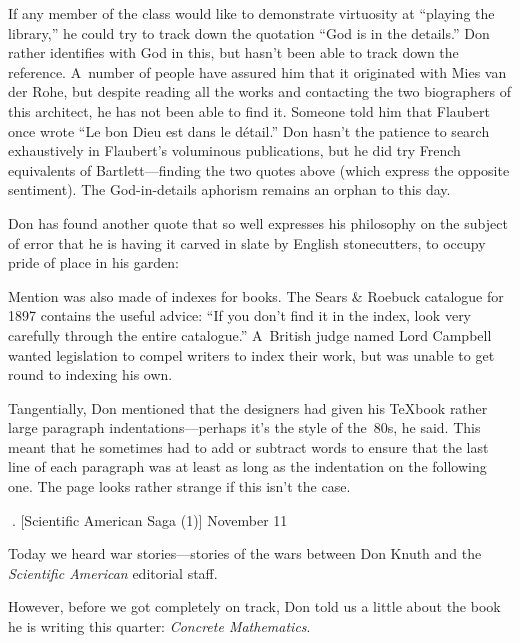 If any member of the class would like to demonstrate virtuosity at
``playing the library,'' he could try to track down the quotation ``God
is in the details.'' Don rather identifies with God in this, but
hasn't been able to track down the reference. A~number of people have
assured him that it originated with Mies van der Rohe, but
despite reading all the works and contacting the two biographers of
this architect, he has not been able to find it. Someone told him
that Flaubert once wrote ``Le bon Dieu est dans le d\'etail.''
Don hasn't the patience to search exhaustively in Flaubert's voluminous
publications, but he did try French equivalents of Bartlett---finding
the two quotes above (which express the opposite sentiment).
The God-in-details aphorism  remains an orphan to this day. 

Don has found another quote that so well expresses his
philosophy on the subject of error that he is having it carved in
slate by English stonecutters, to occupy pride of place in his garden:

\smallskip{}

\smallskip
Mention was also made of indexes for books. The Sears \& Roebuck
catalogue for 1897 contains the useful advice: ``If you don't find it
in the index, look very carefully through the entire catalogue.''
A~British judge named Lord Campbell  wanted legislation to
compel writers to index their work, but was unable to get round to
indexing his own.

Tangentially, Don mentioned that the designers had given his \TeX book
rather large paragraph indentations---perhaps it's the style of the~80s,
 he said. This meant that he sometimes had to add or subtract
words to ensure that the last line of each paragraph was at least as
long as the indentation on the following one. The page looks rather
strange if this isn't the case.

. [Scientific American Saga (1)] \tll November 11

Today we heard war stories---stories of the wars between Don Knuth and
the {\sl Scientific American\/} editorial staff.

However, before we got completely on track, Don told us a little about
the book he is writing this quarter: {\sl Concrete Mathematics}.  

